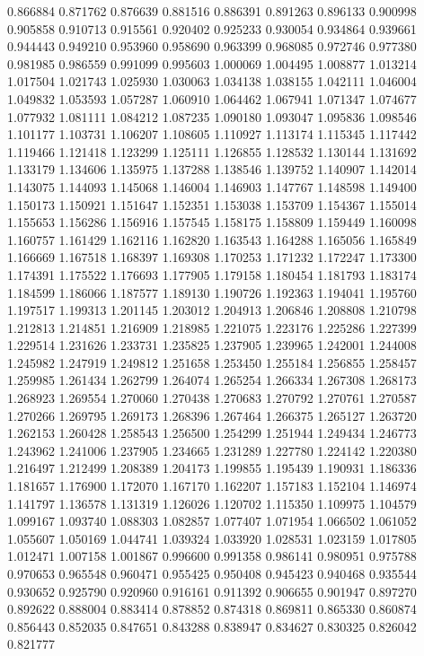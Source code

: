 0.866884
0.871762
0.876639
0.881516
0.886391
0.891263
0.896133
0.900998
0.905858
0.910713
0.915561
0.920402
0.925233
0.930054
0.934864
0.939661
0.944443
0.949210
0.953960
0.958690
0.963399
0.968085
0.972746
0.977380
0.981985
0.986559
0.991099
0.995603
1.000069
1.004495
1.008877
1.013214
1.017504
1.021743
1.025930
1.030063
1.034138
1.038155
1.042111
1.046004
1.049832
1.053593
1.057287
1.060910
1.064462
1.067941
1.071347
1.074677
1.077932
1.081111
1.084212
1.087235
1.090180
1.093047
1.095836
1.098546
1.101177
1.103731
1.106207
1.108605
1.110927
1.113174
1.115345
1.117442
1.119466
1.121418
1.123299
1.125111
1.126855
1.128532
1.130144
1.131692
1.133179
1.134606
1.135975
1.137288
1.138546
1.139752
1.140907
1.142014
1.143075
1.144093
1.145068
1.146004
1.146903
1.147767
1.148598
1.149400
1.150173
1.150921
1.151647
1.152351
1.153038
1.153709
1.154367
1.155014
1.155653
1.156286
1.156916
1.157545
1.158175
1.158809
1.159449
1.160098
1.160757
1.161429
1.162116
1.162820
1.163543
1.164288
1.165056
1.165849
1.166669
1.167518
1.168397
1.169308
1.170253
1.171232
1.172247
1.173300
1.174391
1.175522
1.176693
1.177905
1.179158
1.180454
1.181793
1.183174
1.184599
1.186066
1.187577
1.189130
1.190726
1.192363
1.194041
1.195760
1.197517
1.199313
1.201145
1.203012
1.204913
1.206846
1.208808
1.210798
1.212813
1.214851
1.216909
1.218985
1.221075
1.223176
1.225286
1.227399
1.229514
1.231626
1.233731
1.235825
1.237905
1.239965
1.242001
1.244008
1.245982
1.247919
1.249812
1.251658
1.253450
1.255184
1.256855
1.258457
1.259985
1.261434
1.262799
1.264074
1.265254
1.266334
1.267308
1.268173
1.268923
1.269554
1.270060
1.270438
1.270683
1.270792
1.270761
1.270587
1.270266
1.269795
1.269173
1.268396
1.267464
1.266375
1.265127
1.263720
1.262153
1.260428
1.258543
1.256500
1.254299
1.251944
1.249434
1.246773
1.243962
1.241006
1.237905
1.234665
1.231289
1.227780
1.224142
1.220380
1.216497
1.212499
1.208389
1.204173
1.199855
1.195439
1.190931
1.186336
1.181657
1.176900
1.172070
1.167170
1.162207
1.157183
1.152104
1.146974
1.141797
1.136578
1.131319
1.126026
1.120702
1.115350
1.109975
1.104579
1.099167
1.093740
1.088303
1.082857
1.077407
1.071954
1.066502
1.061052
1.055607
1.050169
1.044741
1.039324
1.033920
1.028531
1.023159
1.017805
1.012471
1.007158
1.001867
0.996600
0.991358
0.986141
0.980951
0.975788
0.970653
0.965548
0.960471
0.955425
0.950408
0.945423
0.940468
0.935544
0.930652
0.925790
0.920960
0.916161
0.911392
0.906655
0.901947
0.897270
0.892622
0.888004
0.883414
0.878852
0.874318
0.869811
0.865330
0.860874
0.856443
0.852035
0.847651
0.843288
0.838947
0.834627
0.830325
0.826042
0.821777
